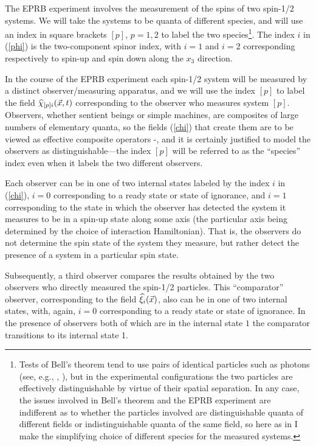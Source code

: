 \documentclass[12pt]{article}
\begin{document}
The EPRB experiment involves the measurement of the spins of two spin-1/2 systems. We will take the systems
to be quanta of different species, and will use an index in square brackets $[p]$\/, $p=1,2$\/ to label
the two species\footnote{Tests of Bell's theorem tend to use pairs of identical particles
such as photons (see, e.g., \cite{Aspectetal82}, \cite{Weihsetal98}), but in the  experimental configurations the two particles are effectively distinguishable
by virtue of their spatial separation. In any case, the issues involved in Bell's theorem and the EPRB experiment
are indifferent as to whether the particles involved are distinguishable quanta of different fields or indistinguishable
quanta of the same field, so here as in \cite{Rubin02} I make the simplifying choice of different species for the measured systems.}.
The index $i$\/ in (\ref{phi}) is the two-component spinor index, with $i=1$\/ and $i=2$\/ corresponding respectively to
spin-up and spin down along the $x_3$\/ direction.

In the course of the EPRB experiment  each spin-1/2 system will be measured
by a distinct observer/measuring apparatus, and we will use the index $[p]$\/ to label the field $\widehat{\chi}_{[p]i}(\vec{x},t)$\/
corresponding to the observer who measures system $[p]$\/.  Observers, whether sentient beings or simple machines, 
are composites of large numbers of elementary quanta, so the fields (\ref{chi}) that create them are to be viewed as effective
composite operators \cite{Tani60}-\cite{Zhouetal01}, and it is certainly justified to model the observers as distinguishable---the index $[p]$\/ will
be referred to as the ``species'' index even when it labels the two different observers. 

Each observer can be in one of two internal states labeled by the index $i$\/ in (\ref{chi}), $i=0$\/ corresponding to a ready state or state of
ignorance, and $i=1$\/ corresponding to the state in which the observer has detected the system it measures to be in a spin-up
state along some axis (the particular axis being determined by the choice of interaction Hamiltonian).  That is, the observers
do not determine the spin  state of the system they measure, but rather detect the presence of a system in a
particular spin state. 




Subsequently, a  third observer compares the results obtained by the two observers who directly measured the
spin-1/2 particles. This ``comparator'' observer, corresponding to the field $\widehat{\xi}_i(\vec{x})$\/, also can be in one of two internal states,
with, again, $i=0$\/ corresponding to a ready state or state of ignorance. In the presence of observers both of which  are in the internal
state $1$\/ the comparator transitions to its internal state 1.  
\end{document}
